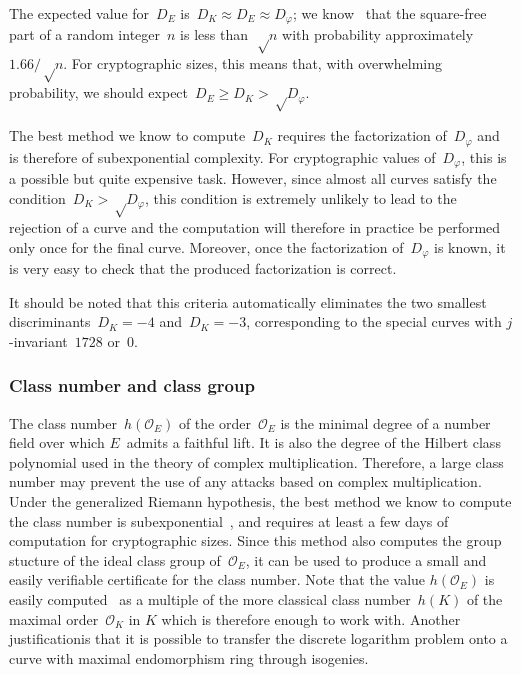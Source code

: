 \documentclass[twocolumn,letterpaper,10pt]{article}
\let\ro\mathcal
\def\pa#1{\left(#1\right)}
\begin{document}
The expected value for~$D_E$ is~$D_K ≈ D_E ≈ D_φ$;
we know~\cite{jis2014cdkd} that the square-free part of
a random integer~$n$ is less than~$√n$
with probability approximately~$1.66/√n$.
For cryptographic sizes, this means that,
with overwhelming probability, we should expect~$D_E \geq D_K > √{D_φ}$.

The best method we know to compute~$D_K$ requires the
factorization of~$D_φ$ and is therefore of subexponential complexity.
For cryptographic values of~$D_φ$, this is a possible but
quite expensive task.
However, since almost all curves satisfy the condition~$D_K > √{D_φ}$,
this condition is extremely unlikely to lead to the rejection of a curve
and the computation will therefore in practice be performed
only once for the final curve.
Moreover, once the factorization of~$D_φ$ is known,
it is very easy to check that the produced
factorization is correct.

It should be noted that this criteria automatically eliminates
the two smallest discriminants~$D_K = -4$ and~$D_K = -3$,
corresponding to the special curves with $j$-invariant~$1728$ or~$0$.

\subsubsection{Class number and class group}
\label{sss:class-group}

The class number~$h(\ro O_E)$ of the order~$\ro O_E$
is the minimal degree of a number field
over which $E$~admits a faithful lift.
It is also the degree of the Hilbert class polynomial
used in the theory of complex multiplication.
Therefore, a large class number may prevent the use
of any attacks based on complex multiplication.
Under the generalized Riemann hypothesis,
the best method we know to compute the class number
is subexponential~\cite{ams1989hmc,amc2010biasse},
and requires at least a few days of computation for cryptographic sizes.
Since this method also computes the group stucture
of the ideal class group of~$\ro O_E$,
it can be used to produce a small and easily verifiable certificate
for the class number.
Note that the value $h(\ro O_E)$ is easily computed~\cite[7.24]{cox1989primes}
as a multiple of the more classical class number~$h(K)$
of the maximal order~$\ro O_K$ in $K$
which is therefore enough to work with.
Another justificationis that
it is possible to transfer the discrete logarithm problem
onto a curve with maximal endomorphism ring
through isogenies.

\medbreak
\end{document}
